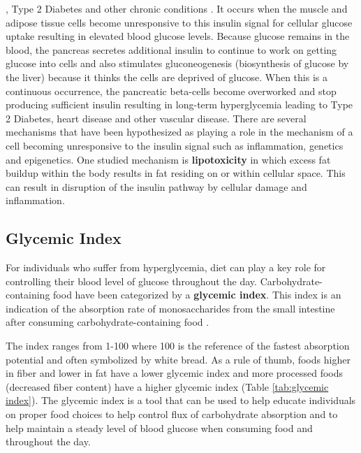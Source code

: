 \documentclass{tufte-handout}
\begin{document}
, Type 2 Diabetes and other chronic conditions \citep{DeFronzo2010}. It occurs when the muscle and adipose tissue cells become unresponsive to this insulin signal for cellular glucose uptake resulting in elevated blood glucose levels. Because glucose remains in the blood, the pancreas secretes additional insulin to continue to work on getting glucose into cells and also stimulates gluconeogenesis (biosynthesis of glucose by the liver) because it thinks the cells are deprived of glucose. When this is a continuous occurrence, the pancreatic beta-cells become overworked and stop producing sufficient insulin resulting in long-term hyperglycemia leading to Type 2 Diabetes, heart disease and other vascular disease. There are several mechanisms that have been hypothesized as playing a role in the mechanism of a cell becoming unresponsive to the insulin signal such as inflammation, genetics and epigenetics. One studied mechanism is \textbf{lipotoxicity} in which excess fat buildup within the body results in fat residing on or within cellular space. This can result in disruption of the insulin pathway by cellular damage and inflammation.

\subsection{Glycemic Index} For individuals who suffer from hyperglycemia, diet can play a key role for controlling their blood level of glucose throughout the day.  Carbohydrate-containing food have been categorized by a \textbf{glycemic index}. This index is an indication of the absorption rate of monosaccharides from the small intestine after consuming carbohydrate-containing food \citep{Atkinson2008,Dodd2011}.

The index ranges from 1-100 where 100 is the reference of the fastest absorption potential and often symbolized by white bread. As a rule of thumb, foods higher in fiber and lower in fat have a lower glycemic index and more processed foods (decreased fiber content) have a higher glycemic index (Table \ref{tab:glycemic index}). The glycemic index is a tool that can be used to help educate individuals on proper food choices to help control flux of carbohydrate absorption and to help maintain a steady level of blood glucose when consuming food and throughout the day.
\end{document}
